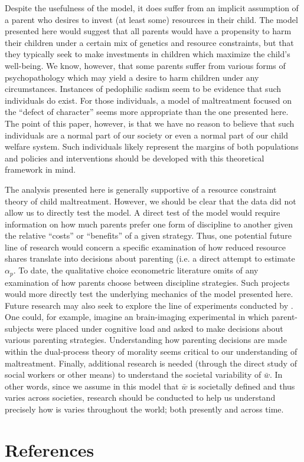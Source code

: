 \documentclass[1p, review]{elsarticle}\usepackage[]{graphicx}\usepackage[]{color}
\begin{document}
Despite the usefulness of the model, it does suffer from an implicit assumption of a parent who desires to invest (at least some) resources in their child. The model presented here would suggest that all parents would have a propensity to harm their children under a certain mix of genetics and resource constraints, but that they typically seek to make investments in children which maximize the child's well-being. We know, however, that some parents suffer from various forms of psychopathology which may yield a desire to harm children under any circumstances. Instances of pedophilic sadism seem to be evidence that such individuals do exist. For those individuals, a model of maltreatment focused on the \citet{Kempe1962} ``defect of character'' seems more appropriate than the one presented here. The point of this paper, however, is that we have no reason to believe that such individuals are a normal part of our society or even a normal part of our child welfare system. Such individuals likely represent the margins of both populations and policies and interventions should be developed with this theoretical framework in mind. 

The analysis presented here is generally supportive of a resource constraint theory of child maltreatment. However, we should be clear that the data did not allow us to directly test the model. A direct test of the model would require information on how much parents prefer one form of discipline to another given the relative ``costs'' or ``benefits'' of a given strategy. Thus, one potential future line of research would concern a specific examination of how reduced resource shares translate into decisions about parenting (i.e. a direct attempt to estimate $\alpha_p$. To date, the qualitative choice econometric literature \citep[in the line of][]{Train1986} omits of any examination of how parents choose between discipline strategies. Such projects would more directly test the underlying mechanics of the model presented here. Future research may also seek to explore the line of experiments conducted by \citet{Greene2014}. One could, for example, imagine an brain-imaging experimental in which parent-subjects were placed under cognitive load and asked to make decisions about various parenting strategies. Understanding how parenting decisions are made within the dual-process theory of morality seems critical to our understanding of maltreatment. Finally, additional research is needed (through the direct study of social workers or other means) to understand the societal variability of $\bar{w}$. In other words, since we assume in this model that $\bar{w}$ is societally defined and thus varies across societies, research should be conducted to help us understand precisely how is varies throughout the world; both presently and across time. 

\newpage 
\theendnotes

\newpage
\section*{References}

\end{document}
